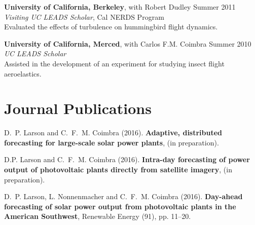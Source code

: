 \documentclass[]{res}
\begin{document}
\begin{resume}
\textbf{University of California, Berkeley}, with Robert Dudley \hfill Summer 2011 \\
\textit{Visiting UC LEADS Scholar}, Cal NERDS Program \\
Evaluated the effects of turbulence on hummingbird flight dynamics.

\textbf{University of California, Merced}, with Carlos F.M. Coimbra \hfill Summer 2010 \\
\textit{UC LEADS Scholar} \\
Assisted in the development of an experiment for studying insect flight aeroelastics.


%


\section{Journal Publications}
\vspace{0.1in}

D.~P. Larson and C.~F.~M. Coimbra (2016). \textbf{Adaptive, distributed forecasting for large-scale solar power plants}, (in preparation).

D.P. Larson and C.~F.~M. Coimbra (2016). \textbf{Intra-day forecasting of power output of photovoltaic plants directly from satellite imagery}, (in preparation).

D.~P. Larson, L. Nonnenmacher and C.~F.~M. Coimbra (2016). \textbf{Day-ahead forecasting of solar power output from photovoltaic plants in the American Southwest}, Renewable Energy (91), pp. 11--20.



\end{resume}
\end{document}
